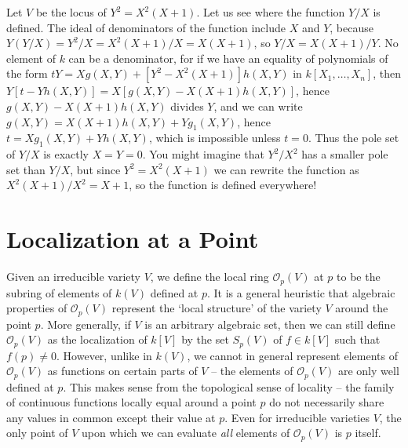 \begin{example}
    Let $V$ be the locus of $Y^2 = X^2(X+1)$. Let us see where the function $Y/X$ is defined. The ideal of denominators of the function include $X$ and $Y$, because $Y(Y/X) = Y^2/X = X^2(X+1)/X = X(X+1)$, so $Y/X = X(X+1)/Y$. No element of $k$ can be a denominator, for if we have an equality of polynomials of the form $tY = Xg(X,Y) + [Y^2 - X^2(X+1)]h(X,Y)$ in $k[X_1, \dots, X_n]$, then $Y[t - Yh(X,Y)] = X[g(X,Y) - X(X+1)h(X,Y)]$, hence $g(X,Y) - X(X+1)h(X,Y)$ divides $Y$, and we can write $g(X,Y) = X(X+1)h(X,Y) + Yg_1(X,Y)$, hence $t = Xg_1(X,Y) + Yh(X,Y)$, which is impossible unless $t = 0$. Thus the pole set of $Y/X$ is exactly $X = Y = 0$. You might imagine that $Y^2/X^2$ has a smaller pole set than $Y/X$, but since $Y^2 = X^2(X+1)$ we can rewrite the function as $X^2(X+1)/X^2 = X+1$, so the function is defined everywhere!
\end{example}

\section{Localization at a Point}

Given an irreducible variety $V$, we define the local ring $\mathcal{O}_p(V)$ at $p$ to be the subring of elements of $k(V)$ defined at $p$. It is a general heuristic that algebraic properties of $\mathcal{O}_p(V)$ represent the `local structure' of the variety $V$ around the point $p$. More generally, if $V$ is an arbitrary algebraic set, then we can still define $\mathcal{O}_p(V)$ as the localization of $k[V]$ by the set $S_p(V)$ of $f \in k[V]$ such that $f(p) \neq 0$. However, unlike in $k(V)$, we cannot in general represent elements of $\mathcal{O}_p(V)$ as functions on certain parts of $V$ -- the elements of $\mathcal{O}_p(V)$ are only well defined at $p$. This makes sense from the topological sense of locality -- the family of continuous functions locally equal around a point $p$ do not necessarily share any values in common except their value at $p$. Even for irreducible varieties $V$, the only point of $V$ upon which we can evaluate \emph{all} elements of $\mathcal{O}_p(V)$ is $p$ itself.

